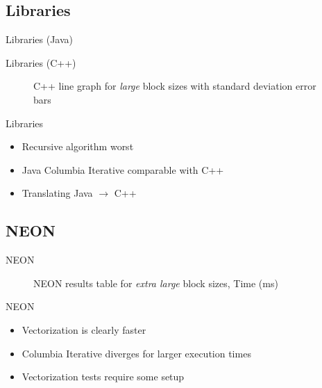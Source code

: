 \documentclass[xcolor={table}]{beamer}
\begin{document}
\subsection{Libraries}
\begin{frame}{Libraries (Java)}
    \begin{table}
        \centering
        
        \caption{Java line graph for \emph{large} block sizes with standard deviation error bars}
    \end{table}
\end{frame}
\begin{frame}{Libraries (C++)}
    \begin{figure}
        \centering
        
        \caption{C++ line graph for \emph{large} block sizes with standard deviation error bars}
    \end{figure}
\end{frame}
\begin{frame}{Libraries}
    \begin{itemize}
        \item Recursive algorithm worst
        \item Java Columbia Iterative comparable with C++
        \item Translating Java $\rightarrow$ C++
    \end{itemize}
\end{frame}

\subsection{NEON}
\begin{frame}{NEON}
    \begin{figure}
        \centering
        
        \caption{NEON results table for \emph{extra large} block sizes, Time (ms)}
    \end{figure}
\end{frame}

\begin{frame}{NEON}
    \begin{itemize}
        \item Vectorization is clearly faster 
        \item Columbia Iterative diverges for larger execution times
        \item Vectorization tests require some setup
    \end{itemize}
\end{frame}
\end{document}
